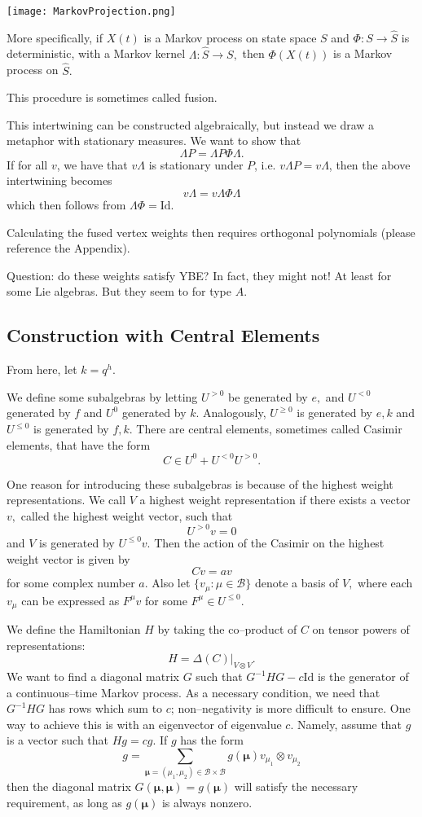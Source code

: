\documentclass{ximera}
\begin{document}
\texttt{[image: MarkovProjection.png]}

More specifically, if $X(t)$ is a Markov process on state space $S$ and $\Phi:S\rightarrow \hat{S}$ is deterministic, 
with a Markov kernel $\Lambda: \hat{S}\rightarrow S,$ then $\Phi(X(t))$ is a Markov process on $\hat{S}.$

This procedure is sometimes called fusion. 

This intertwining can be constructed algebraically, but instead we draw a metaphor with stationary measures.
We want to show that 
$$
\Lambda P = \Lambda P \Phi \Lambda.
$$
If for all $v$, we have that $v\Lambda$ is stationary under $P$, i.e. $v\Lambda P = v\Lambda$, then the
above intertwining becomes 
$$
v\Lambda = v\Lambda \Phi \Lambda
$$
which then follows from $\Lambda\Phi=\mathrm{Id}.$

Calculating the fused vertex weights then requires orthogonal polynomials (please reference the Appendix).

Question: do these weights satisfy YBE? In fact, they might not! At least
for some Lie algebras. But they seem to for type $A.$

\subsection{Construction with Central Elements}
From here, let $k=q^h.$

We define some subalgebras by letting $U^{> 0}$ be generated by $e,$ and $U^{<0}$ generated by $f$ and
$U^0$ generated by $k$. Analogously, $U^{\geq 0}$ is generated by $e,k$ and $U^{\leq 0}$ is generated
by $f,k$. There are central elements, sometimes called Casimir elements, that have the form
$$
C \in U^0 + U^{< 0}U^{> 0}.
$$

One reason for introducing these subalgebras is because of the highest weight representations. We call $V$ a 
highest weight representation if there exists a vector $v,$ called the highest weight vector, such that
$$
U^{>0}v=0
$$
and $V$ is generated by $U^{\leq 0}v.$ Then the action of the Casimir on the highest weight vector is given by
$$
Cv = av
$$
for some complex number $a.$ Also let $\{v_{\mu}:\mu \in\mathcal{B}\}$ denote a basis of $V,$ where each $v_{\mu}$
can be expressed as $F^{\mu}v$ for some $F^{\mu} \in U^{\leq 0}.$

We define the Hamiltonian $H$ by taking the co--product of $C$ on tensor powers of representations: 
$$
H = \Delta(C) \vert_{V \otimes V}.
$$
We want to find a diagonal matrix $G$ such that $G^{-1}HG-c\mathrm{Id}$ is the generator of a continuous--time
Markov process. As a necessary condition, we need that $G^{-1}HG$ has rows which sum to $c$; non--negativity is more
difficult to ensure. One way to achieve this is with an eigenvector of eigenvalue $c$. Namely, assume that 
$g$ is a vector such that $Hg=cg.$ If $g$ has the form
$$
g=\sum_{\boldsymbol{\mu}=(\mu_1,\mu_2)\in \mathcal{B}\times \mathcal{B}} g(\boldsymbol{\mu}) v_{\mu_1}\otimes v_{\mu_2} 
$$
then the diagonal matrix $G(\boldsymbol{\mu},\boldsymbol{\mu})=g(\boldsymbol{\mu})$ will satisfy the necessary requirement, 
as long as $g(\boldsymbol{\mu})$ is always nonzero.
\end{document}
